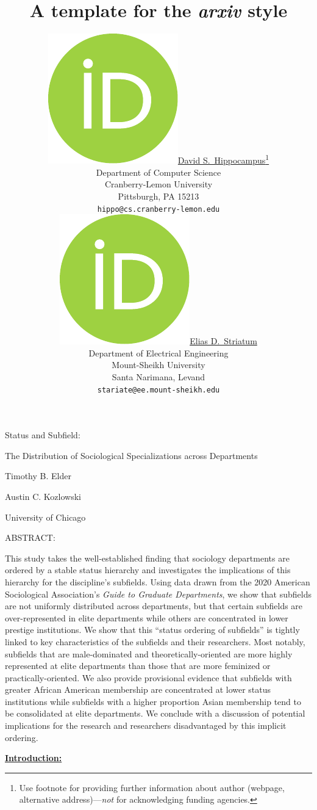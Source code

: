 \documentclass{article}
\title{A template for the \emph{arxiv} style}
\author{ \href{https://orcid.org/0000-0000-0000-0000}{\includegraphics[scale=0.06]{orcid.pdf}\hspace{1mm}David S.~Hippocampus}\thanks{Use footnote for providing further
		information about author (webpage, alternative
		address)---\emph{not} for acknowledging funding agencies.} \\
	Department of Computer Science\\
	Cranberry-Lemon University\\
	Pittsburgh, PA 15213 \\
	\texttt{hippo@cs.cranberry-lemon.edu} \\
	\And
	\href{https://orcid.org/0000-0000-0000-0000}{\includegraphics[scale=0.06]{orcid.pdf}\hspace{1mm}Elias D.~Striatum} \\
	Department of Electrical Engineering\\
	Mount-Sheikh University\\
	Santa Narimana, Levand \\
	\texttt{stariate@ee.mount-sheikh.edu} \\
}
\begin{document}
\maketitle

\begin{abstract}
	\lipsum[1]
\end{abstract}




Status and Subfield:

The Distribution of Sociological Specializations across Departments

Timothy B. Elder

Austin C. Kozlowski

University of Chicago

ABSTRACT:

This study takes the well-established finding that sociology departments
are ordered by a stable status hierarchy and investigates the
implications of this hierarchy for the discipline's subfields. Using
data drawn from the 2020 American Sociological Association's \emph{Guide
to Graduate Departments}, we show that subfields are not uniformly
distributed across departments, but that certain subfields are
over-represented in elite departments while others are concentrated in
lower prestige institutions. We show that this ``status ordering of
subfields'' is tightly linked to key characteristics of the subfields
and their researchers. Most notably, subfields that are male-dominated
and theoretically-oriented are more highly represented at elite
departments than those that are more feminized or practically-oriented.
We also provide provisional evidence that subfields with greater African
American membership are concentrated at lower status institutions while
subfields with a higher proportion Asian membership tend to be
consolidated at elite departments. We conclude with a discussion of
potential implications for the research and researchers disadvantaged by
this implicit ordering.

\textbf{\uline{Introduction:}}
\end{document}
